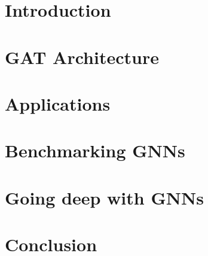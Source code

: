 \documentclass[11pt,oneside]{book}
\begin{document}


\clearpage
\newpage

\chapter*{Introduction}


\chapter*{GAT Architecture}


\chapter*{Applications}


\chapter*{Benchmarking GNNs}


\chapter*{Going deep with GNNs}


\chapter*{Conclusion}


\newpage
{}

\renewcommand\bibname{References}

\end{document}
